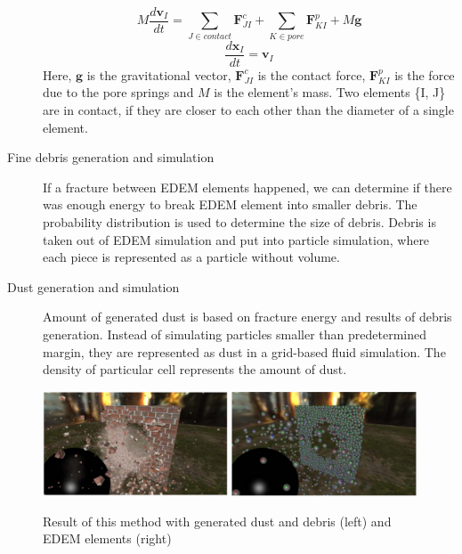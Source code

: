 \begin{description}
\[M\frac{d\mathbf{v}_I}{dt} = \sum_{J \in contact}^{} \mathbf{F}_{JI}^c + \sum_{K \in pore}^{} \mathbf{F}_{KI}^p + M\mathbf{g} \]
\[ \frac{d\mathbf{x}_I}{dt} = \mathbf{v}_I \]
Here, $\mathbf{g}$ is the gravitational vector, $\mathbf{F}^c_{JI}$ is the contact force, $\mathbf{F}^p_{KI}$ is the force due to the pore springs and $\mathit{M}$ is the element’s mass. Two elements \{I, J\} are in contact, if they are closer to each other than the diameter of a single element.

\item[Fine debris generation and simulation] If a fracture between EDEM elements happened, we can determine if there was enough energy to break EDEM element into smaller debris. The probability distribution is used to determine the size of debris. Debris is taken out of EDEM simulation and put into particle simulation, where each piece is represented as a particle without volume.

\item[Dust generation and simulation] Amount of generated dust is based on fracture energy and results of debris generation. Instead of simulating particles smaller than predetermined margin, they are represented as dust in a grid-based fluid simulation. The density of particular cell represents the amount of dust.

\end{description}
 \begin{figure}
        \centering
        \includegraphics[width=0.49\textwidth]{img/edem_real}
        \includegraphics[width=0.49\textwidth]{img/edem}
        \caption{Result of this method with generated dust and debris (left) and EDEM elements (right) \cite{edem}}
        \label{fig:edem}
    \end{figure}
   
